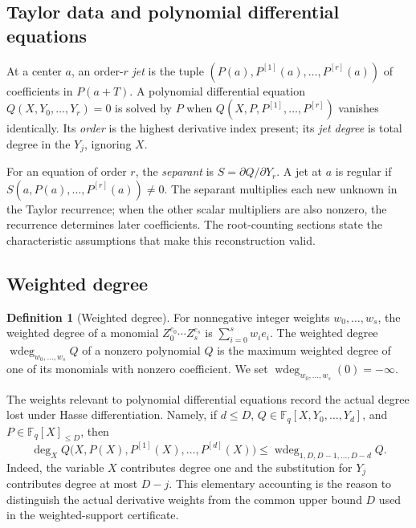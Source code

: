 \documentclass[11pt,letterpaper]{article}
\theoremstyle{definition}
\newtheorem{definition}[definition]{Definition}
\newcommand{\F}{\mathbb{F}}
\newcommand{\wtdeg}{\operatorname{wdeg}}
\begin{document}
\subsection{Taylor data and polynomial differential equations}
\label{sec:taylor-terminology}

At a center $a$, an order-$r$ \emph{jet} is the tuple
$(P(a),P^{[1]}(a),\ldots,P^{[r]}(a))$ of coefficients in $P(a+T)$.
A polynomial differential equation $Q(X,Y_0,\ldots,Y_r)=0$ is solved by
$P$ when $Q(X,P,P^{[1]},\ldots,P^{[r]})$ vanishes identically.
Its \emph{order} is the highest derivative index present; its \emph{jet degree}
is total degree in the $Y_j$, ignoring $X$.

For an equation of order $r$, the \emph{separant} is $S=\partial Q/\partial Y_r$.
A jet at $a$ is regular if $S(a,P(a),\ldots,P^{[r]}(a))\ne0$.
The separant multiplies each new unknown in the Taylor recurrence; when the
other scalar multipliers are also nonzero, the recurrence determines later
coefficients. The root-counting sections state the characteristic assumptions
that make this reconstruction valid.

\subsection{Weighted degree}

\begin{definition}[Weighted degree]
\label{def:weighted-degree}
For nonnegative integer weights \(w_0,\ldots,w_s\), the weighted degree of a
monomial \(Z_0^{e_0}\cdots Z_s^{e_s}\) is
\(\sum_{i=0}^s w_ie_i\).  The weighted degree
\(\wtdeg_{w_0,\ldots,w_s}Q\) of a nonzero polynomial \(Q\) is the maximum
weighted degree of one of its monomials with nonzero coefficient.
We set $\wtdeg_{w_0,\ldots,w_s}(0)=-\infty$.
\end{definition}

The weights relevant to polynomial differential equations record the actual
degree lost under Hasse differentiation.  Namely, if \(d\leq D\),
\(Q\in\F_q[X,Y_0,\ldots,Y_d]\), and \(P\in\F_q[X]_{\leq D}\), then
\begin{equation}
  \deg_X Q\bigl(X,P(X),P^{[1]}(X),\ldots,P^{[d]}(X)\bigr)
  \leq
  \wtdeg_{1,D,D-1,\ldots,D-d}Q.
  \label{eq:weighted-specialization-degree}
\end{equation}
Indeed, the variable \(X\) contributes degree one and the substitution for
\(Y_j\) contributes degree at most \(D-j\).  This elementary accounting is
the reason to distinguish the actual derivative weights from the common
upper bound $D$ used in the weighted-support certificate.
\end{document}
